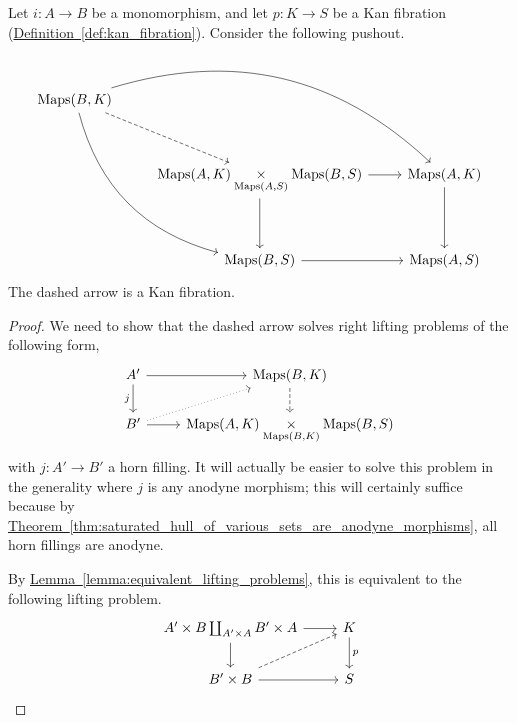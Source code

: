 \documentclass[main.tex]{subfiles}
\begin{document}
\begin{lemma}
  \label{lemma:kan_fibrations_preserved_under_dual_to_smash_product}
  Let $i\colon A \to B$ be a monomorphism, and let $p\colon K \to S$ be a Kan fibration (\hyperref[def:kan_fibration]{Definition~\ref*{def:kan_fibration}}). Consider the following pushout.
  \begin{equation*}
    \begin{tikzcd}[row sep=huge]
      \Maps(B, K)
      \arrow[rrd, bend left]
      \arrow[rdd, bend right]
      \arrow[rd, dashed]
      \\
      & \Maps(A, K) \underset{\Maps(A, S)}{\times} \Maps(B, S)
      \arrow[r]
      \arrow[d]
      & \Maps(A, K)
      \arrow[d]
      \\
      & \Maps(B, S)
      \arrow[r]
      & \Maps(A, S)
    \end{tikzcd}
  \end{equation*}
  The dashed arrow is a Kan fibration.
\end{lemma}
\begin{proof}
  We need to show that the dashed arrow solves right lifting problems of the following form,
  \begin{equation*}
    \begin{tikzcd}
      A'
      \arrow[d, swap, "j"]
      \arrow[r]
      & \Maps(B, K)
      \arrow[d, dashed]
      \\
      B'
      \arrow[r,]
      \arrow[ur, dotted]
      & \Maps(A, K) \underset{\Maps(B, K)}{\times} \Maps(B, S)
    \end{tikzcd}
  \end{equation*}
  with $j\colon A' \to B'$ a horn filling. It will actually be easier to solve this problem in the generality where $j$ is any anodyne morphism; this will certainly suffice because by \hyperref[thm:saturated_hull_of_various_sets_are_anodyne_morphisms]{Theorem~\ref*{thm:saturated_hull_of_various_sets_are_anodyne_morphisms}}, all horn fillings are anodyne.

  By \hyperref[lemma:equivalent_lifting_problems]{Lemma~\ref*{lemma:equivalent_lifting_problems}}, this is equivalent to the following lifting problem.
  \begin{equation*}
    \begin{tikzcd}
      A' \times B \coprod_{A' \times A} B' \times A
      \arrow[r]
      \arrow[d]
      & K
      \arrow[d, "p"]
      \\
      B' \times B
      \arrow[r]
      \arrow[ur, dashed]
      & S
    \end{tikzcd}
  \end{equation*}
\end{proof}
\end{document}
